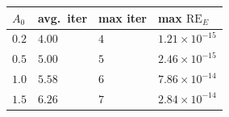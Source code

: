 \begin{tabular}{llll}
\toprule
$A_0$ & avg.\ iter & max iter & max $\mathrm{RE}_E$ \\
\midrule
\(0.2\) & \(4.00\) & \(4\) & \(1.21\times10^{-15}\) \\
\(0.5\) & \(5.00\) & \(5\) & \(2.46\times10^{-15}\) \\
\(1.0\) & \(5.58\) & \(6\) & \(7.86\times10^{-14}\) \\
\(1.5\) & \(6.26\) & \(7\) & \(2.84\times10^{-14}\) \\
\bottomrule
\end{tabular}
